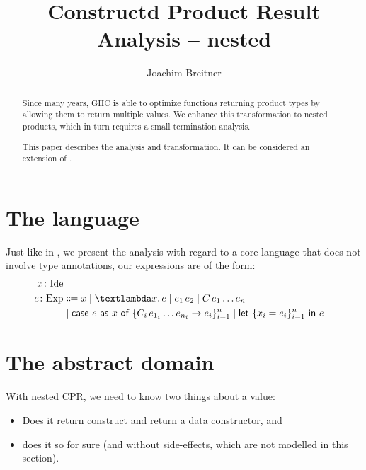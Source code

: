 \documentclass[parskip=half]{scrartcl}
\title{Constructd Product Result Analysis -- nested}
\author{Joachim Breitner}
\newcommand{\sIde}{\text{Ide}}
\newcommand{\sExp}{\text{Exp}}
\newcommand{\sApp}[2]{#1\,#2}
\newcommand{\sLam}[2]{\text{\textlambda} #1.\, #2}
\newcommand{\sCase}[4]{\text{\textsf{case}}\ #1\  \textsf{as}\ #2\ \textsf{of}\ \{#3 \rightarrow #4\}_{i=1}^n}
\newcommand{\sLet}[3]{\text{\textsf{let}}\ \{#1 = #2\}_{i=1}^n\ \text{\textsf{in}}\ #3}
\begin{document}
\maketitle

\begin{abstract}
Since many years, GHC is able to optimize functions returning product types by allowing them to return multiple values. We enhance this transformation to nested products, which in turn requires a small termination analysis.

This paper describes the analysis and transformation. It can be considered an extension of \citep{cpr}.
\end{abstract}

\tableofcontents

\section{The language}

Just like in \citep{cpr}, we present the analysis with regard to a core language that does not involve type annotations, our expressions are of the form:
%
\begin{align*}
x \colon \sIde \\
e \colon \sExp &\Coloneqq x
	\mid \sLam x e
	\mid \sApp {e_1} {e_2}
	\mid \sApp C {e_1\ldots e_n} \\
&	\mid \sCase e x {\sApp {C_i} {e_{1_i}\ldots e_{n_i}}} {e_i}
	\mid \sLet {x_i} {e_i} e
\end{align*}

\section{The abstract domain}

With nested CPR, we need to know two things about a value:
\begin{itemize}
\item Does it return construct and return a data constructor, and
\item does it so for sure (and without side-effects, which are not modelled in this section).
\end{itemize}

\newcommand{\dR}{\textbf{R}}
\newcommand{\dC}{\textbf{C}}
\newcommand{\dD}{\textbf{D}}
\newcommand{\noCPR}{\bullet}
\newcommand{\dunno}[1]{#1?}
\newcommand{\conv}[1]{#1!}
\newcommand{\dLam}[1]{\sLam\bullet{#1}}
\newcommand{\dApp}[1]{\sApp{#1}\bullet}
\end{document}
